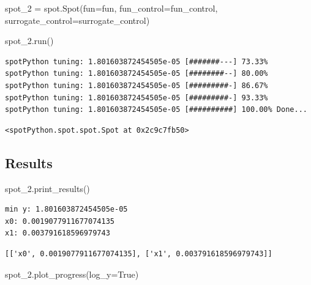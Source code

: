 \documentclass[
  letterpaper,
  DIV=11,
  numbers=noendperiod]{scrreprt}
\newenvironment{Shaded}{\begin{snugshade}}{\end{snugshade}}
\newcommand{\NormalTok}[1]{\textcolor[rgb]{0.00,0.23,0.31}{#1}}
\newcommand{\OperatorTok}[1]{\textcolor[rgb]{0.37,0.37,0.37}{#1}}
\newcommand{\VariableTok}[1]{\textcolor[rgb]{0.07,0.07,0.07}{#1}}
\begin{document}
\begin{Shaded}
\begin{Highlighting}[]
\NormalTok{spot\_2 }\OperatorTok{=}\NormalTok{ spot.Spot(fun}\OperatorTok{=}\NormalTok{fun,}
\NormalTok{                   fun\_control}\OperatorTok{=}\NormalTok{fun\_control,}
\NormalTok{                   surrogate\_control}\OperatorTok{=}\NormalTok{surrogate\_control)}

\NormalTok{spot\_2.run()}
\end{Highlighting}
\end{Shaded}

\begin{verbatim}
spotPython tuning: 1.801603872454505e-05 [#######---] 73.33% 
spotPython tuning: 1.801603872454505e-05 [########--] 80.00% 
spotPython tuning: 1.801603872454505e-05 [#########-] 86.67% 
spotPython tuning: 1.801603872454505e-05 [#########-] 93.33% 
spotPython tuning: 1.801603872454505e-05 [##########] 100.00% Done...
\end{verbatim}

\begin{verbatim}
<spotPython.spot.spot.Spot at 0x2c9c7fb50>
\end{verbatim}

\subsection{Results}\label{results-7}

\begin{Shaded}
\begin{Highlighting}[]
\NormalTok{spot\_2.print\_results()}
\end{Highlighting}
\end{Shaded}

\begin{verbatim}
min y: 1.801603872454505e-05
x0: 0.0019077911677074135
x1: 0.003791618596979743
\end{verbatim}

\begin{verbatim}
[['x0', 0.0019077911677074135], ['x1', 0.003791618596979743]]
\end{verbatim}

\begin{Shaded}
\begin{Highlighting}[]
\NormalTok{spot\_2.plot\_progress(log\_y}\OperatorTok{=}\VariableTok{True}\NormalTok{)}
\end{Highlighting}
\end{Shaded}
\end{document}
